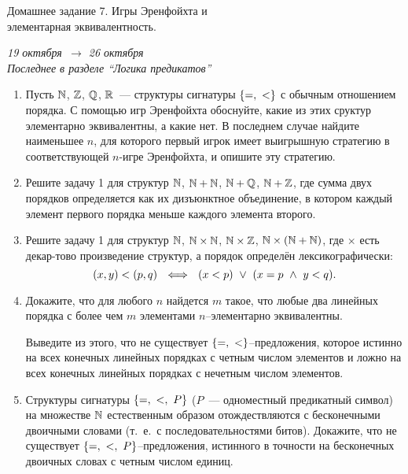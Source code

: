 \documentclass[a4paper,11pt]{article}
\begin{document}
\begin{center}
	{\Large Домашнее задание 7. Игры Эренфойхта и\\[1.5mm] элементарная эквивалентность.}

	{\it 19 октября\ \(\to\) 26 октября} \\
	{\it Последнее в разделе “Логика предикатов”}
\end{center}

\begin{enumerate}
	\item Пусть \(\bn\), \(\bz\), \(\bq\), \(\br\)~— структуры сигнатуры $\set*{ =,\ < }$ с обычным отношением порядка. С помощью игр Эренфойхта обоснуйте, какие из этих сруктур элементарно эквивалентны, а какие нет. В последнем случае найдите наименьшее $n$, для которого первый игрок имеет выигрышную стратегию в соответствующей $n$-игре Эренфойхта, и опишите эту стратегию.

	\item Решите задачу 1 для структур \(\bn\), \(\bn+\bn\), \(\bn+\bq\), \(\bn+\bz\), где сумма двух порядков определяется как их дизъюнктное объединение, в котором каждый элемент первого порядка меньше каждого элемента второго. 

	\item Решите задачу 1 для структур \(\bn\), \(\bn \times \bn\), \(\bn \times \bz\), \(\bn \times \lr*{\bn + \bn}\), где $\times$ есть декар-\linebreak тово произведение структур, а порядок определён лексикографически:
	\[ (x,y) < (p,q)\ \ \Longleftrightarrow\ \ 
	   \lr*{x<p}\ \lor\ \lr*{x=p\ \land\ y<q}.\]

	\item Докажите, что для любого $n$ найдется $m$ такое, что любые два линейных порядка с более чем $m$ элементами $n$--элементарно эквивалентны.

	Выведите из этого, что не существует $\set*{ =,\ < }$--предложения, которое истинно на всех конечных линейных порядках с четным числом элементов и ложно на всех конечных линейных порядках с нечетным числом элементов.

	\item Структуры сигнатуры $\set*{ =,\ <,\ P }$ ($P$~— одноместный предикатный символ) на множестве $\bn$ естественным образом отождествляются с бесконечными двоичными словами (т.~е.~с последовательностями битов). Докажите, что не существует $\set*{ =,\ <,\ P }$--предложения, истинного в точности на бесконечных двоичных словах с четным числом единиц. 

\end{enumerate}
\end{document}
